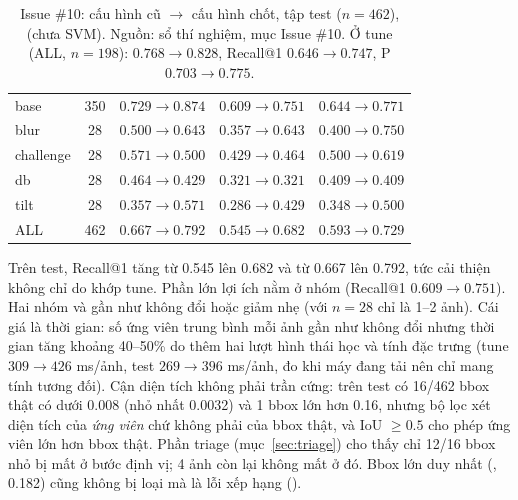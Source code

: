 \begin{table}[htbp]
\centering
\caption[Issue \#10: cấu hình cũ so với cấu hình chốt (test)]{Issue \#10: cấu hình cũ $\to$ cấu hình chốt, tập test ($n=462$),  (chưa SVM). Nguồn: sổ thí nghiệm, mục Issue \#10. Ở tune (ALL, $n=198$):  $0.768\to 0.828$, Recall@1 $0.646\to 0.747$, P $0.703\to 0.775$.}
\label{tab:i10}
\small
{}
\begin{tabularx}{\textwidth}{lCCCC}
\hline
{}  &  &  &  &  \\
\hline
base & 350 & $0.729\to 0.874$ & $0.609\to 0.751$ & $0.644\to 0.771$ \\
blur & 28 & $0.500\to 0.643$ & $0.357\to 0.643$ & $0.400\to 0.750$ \\
challenge & 28 & $0.571\to 0.500$ & $0.429\to 0.464$ & $0.500\to 0.619$ \\
db & 28 & $0.464\to 0.429$ & $0.321\to 0.321$ & $0.409\to 0.409$ \\
tilt & 28 & $0.357\to 0.571$ & $0.286\to 0.429$ & $0.348\to 0.500$ \\
\hline
ALL & 462 & $0.667\to 0.792$ & $0.545\to 0.682$ & $0.593\to 0.729$ \\
\hline
\end{tabularx}
\end{table}

Trên test, Recall@1 tăng từ 0.545 lên 0.682 và  từ 0.667 lên 0.792, tức cải thiện không chỉ do khớp tune. Phần lớn lợi ích nằm ở nhóm  (Recall@1 $0.609\to 0.751$). Hai nhóm  và  gần như không đổi hoặc giảm nhẹ  (với $n=28$ chỉ là 1--2 ảnh). Cái giá là thời gian: số ứng viên trung bình mỗi ảnh gần như không đổi nhưng thời gian tăng khoảng 40--50\% do thêm hai lượt hình thái học và tính đặc trưng (tune $309\to 426$ ms/ảnh, test $269\to 396$ ms/ảnh, đo khi máy đang tải nên chỉ mang tính tương đối). Cận diện tích không phải trần cứng: trên test có 16/462 bbox thật có  dưới 0.008 (nhỏ nhất 0.0032) và 1 bbox lớn hơn 0.16, nhưng bộ lọc xét diện tích  của \emph{ứng viên} chứ không phải của bbox thật, và IoU $\ge 0.5$ cho phép ứng viên lớn hơn bbox thật. Phần triage (mục~\ref{sec:triage}) cho thấy chỉ 12/16 bbox nhỏ bị mất ở bước định vị; 4 ảnh còn lại không mất ở đó. Bbox lớn duy nhất (, 0.182) cũng không bị loại mà là lỗi xếp hạng ().

